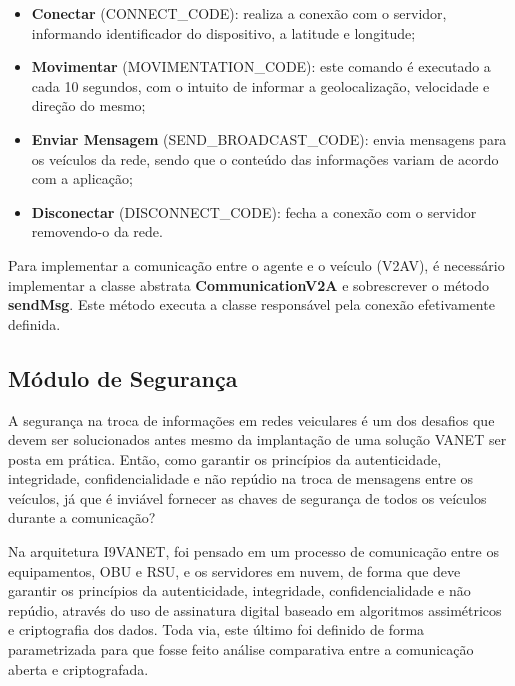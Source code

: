 \documentclass[
	12pt,				%
	oneside,			%
	a4paper,			%
	english,			%
	brazil				%
	]{abntex2ppgsi}
\begin{document}
\begin{itemize}
	\item{\textbf{Conectar} (CONNECT\_CODE): realiza a conexão com o servidor, informando identificador do dispositivo, a latitude e longitude;}	
	\item{\textbf{Movimentar} (MOVIMENTATION\_CODE): este comando é executado a cada 10 segundos, com o intuito de informar a geolocalização, velocidade e direção do mesmo;}	
	\item{\textbf{Enviar Mensagem} (SEND\_BROADCAST\_CODE): envia mensagens para os veículos da rede, sendo que o conteúdo das informações variam de acordo com a aplicação;}	
	\item{\textbf{Disconectar} (DISCONNECT\_CODE): fecha a conexão com o servidor removendo-o da rede.}	
\end{itemize} 

Para implementar a comunicação entre o agente e o veículo (V2AV), é necessário implementar a classe abstrata \textbf{CommunicationV2A} e sobrescrever o método \textbf{sendMsg}. Este método executa a classe responsável pela conexão efetivamente definida.


\subsection{Módulo de Segurança}


A segurança na troca de informações em redes veiculares é um dos desafios que devem ser solucionados antes mesmo da implantação de uma solução VANET ser posta em prática. Então, como garantir os princípios da autenticidade, integridade, confidencialidade e  não repúdio na troca de mensagens entre os veículos, já que é inviável fornecer as chaves de segurança de todos os veículos durante a comunicação? 

Na arquitetura I9VANET, foi pensado em um processo de comunicação entre os equipamentos, OBU e RSU, e os servidores em nuvem, de forma que deve garantir os princípios da autenticidade, integridade, confidencialidade e não repúdio, através do uso de assinatura digital baseado em algoritmos assimétricos e criptografia dos dados. Toda via, este último foi definido de forma parametrizada para que fosse feito análise comparativa entre a comunicação aberta e criptografada.
\end{document}
